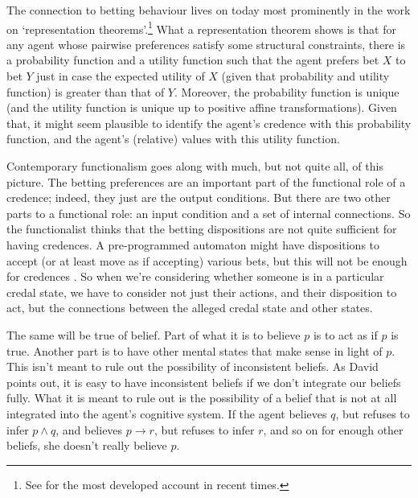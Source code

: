 The connection to betting behaviour lives on today most prominently in the work on `representation theorems'.\footnote{See \cite{Maher1993} for the most developed account in recent times.} What a representation theorem shows is that for any agent whose pairwise preferences satisfy some structural constraints, there is a probability function and a utility function such that the agent prefers bet \(X\) to bet \(Y\) just in case the expected utility of \(X\) (given that probability and utility function) is greater than that of \(Y\). Moreover, the probability function is unique (and the utility function is unique up to positive affine transformations). Given that, it might seem plausible to identify the agent's credence with this probability function, and the agent's (relative) values with this utility function.

Contemporary functionalism goes along with much, but not quite all, of this picture. The betting preferences are an important part of the functional role of a credence; indeed, they just are the output conditions. But there are two other parts to a functional role: an input condition and a set of internal connections. So the functionalist thinks that the betting dispositions are not quite sufficient for having credences. A pre-programmed automaton might have dispositions to accept (or at least move as if accepting) various bets, but this will not be enough for credences \citep{DBMJackson2007}. So when we're considering whether someone is in a particular credal state, we have to consider not just their actions, and their disposition to act, but the connections between the alleged credal state and other states.

The same will be true of belief. Part of what it is to believe \(p\) is to act as if \(p\) is true. Another part is to have other mental states that make sense in light of \(p\). This isn't meant to rule out the possibility of inconsistent beliefs. As David \cite{Lewis1982c} points out, it is easy to have inconsistent beliefs if we don't integrate our beliefs fully. What it is meant to rule out is the possibility of a belief that is not at all integrated into the agent's cognitive system. If the agent believes \(q\), but refuses to infer \(p \wedge q\), and believes \(p \rightarrow r\), but refuses to infer \(r\), and so on for enough other beliefs, she doesn't really believe \(p\). 

